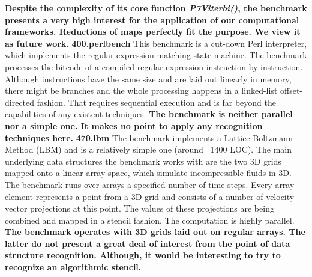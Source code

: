 \quad\textbf{Despite the complexity of its core function \textit{P7Viterbi()}, the benchmark presents a very high interest for the application of our computational frameworks. Reductions of maps perfectly fit the purpose. We view it as future work.}\newline\null
\quad \textbf{400.perlbench} \quad This benchmark is a cut-down Perl interpreter, which implements the regular expression matching state machine. The benchmark processes the bitcode of a compiled regular expression instruction by instruction. Although instructions have the same size and are laid out linearly in memory, there might be branches and the whole processing happens in a linked-list offset-directed fashion. That requires sequential execution and is far beyond the capabilities of any existent techniques.\newline\null
\quad\textbf{The benchmark is neither parallel nor a simple one. It makes no point to apply any recognition techniques here.}\newline\null
\quad \textbf{470.lbm} \quad The benchmark implements a Lattice Boltzmann Method (LBM) and is a relatively simple one (around ~1400 LOC). The main underlying data structures the benchmark works with are the two 3D grids mapped onto a linear array space, which simulate incompressible fluids in 3D. The benchmark runs over arrays a specified number of time steps. Every array element represents a point from a 3D grid and consists of a number of velocity vector projections at this point. The values of these projections are being combined and mapped in a stencil fashion. The computation is highly parallel.\newline\null
\quad\textbf{The benchmark operates with 3D grids laid out on regular arrays. The latter do not present a great deal of interest from the point of data structure recognition. Although, it would be interesting to try to recognize an algorithmic stencil.}
